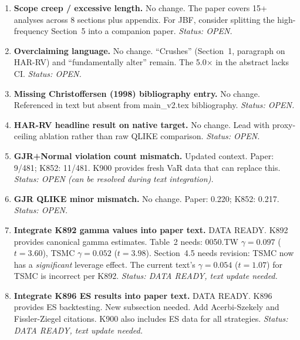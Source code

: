 \documentclass[12pt,a4paper]{article}
\begin{document}
\begin{enumerate}[label=\textcolor{warncolor}{M\arabic*}]

\item \textbf{Scope creep / excessive length.} \textcolor{warncolor}{No change.} The paper covers 15+ analyses across 8 sections plus appendix. For JBF, consider splitting the high-frequency Section~5 into a companion paper. \textit{Status: OPEN.}

\item \textbf{Overclaiming language.} \textcolor{warncolor}{No change.} ``Crushes'' (Section~1, paragraph on HAR-RV) and ``fundamentally alter'' remain. The 5.0$\times$ in the abstract lacks CI. \textit{Status: OPEN.}

\item \textbf{Missing Christoffersen (1998) bibliography entry.} \textcolor{warncolor}{No change.} Referenced in text but absent from main\_v2.tex bibliography. \textit{Status: OPEN.}

\item \textbf{HAR-RV headline result on native target.} \textcolor{warncolor}{No change.} Lead with proxy-ceiling ablation rather than raw QLIKE comparison. \textit{Status: OPEN.}

\item \textbf{GJR+Normal violation count mismatch.} \textcolor{warncolor}{Updated context.} Paper: 9/481; K852: 11/481. K900 provides fresh VaR data that can replace this. \textit{Status: OPEN (can be resolved during text integration).}

\item \textbf{GJR QLIKE minor mismatch.} \textcolor{warncolor}{No change.} Paper: 0.220; K852: 0.217. \textit{Status: OPEN.}

\item \textbf{Integrate K892 gamma values into paper text.} \textcolor{fixedblue}{DATA READY.} K892 provides canonical gamma estimates. Table~2 needs: 0050.TW $\gamma = 0.097$ ($t = 3.60$), TSMC $\gamma = 0.052$ ($t = 3.98$). Section~4.5 needs revision: TSMC now has a \textit{significant} leverage effect. The current text's $\gamma = 0.054$ ($t = 1.07$) for TSMC is incorrect per K892. \textit{Status: DATA READY, text update needed.}

\item \textbf{Integrate K896 ES results into paper text.} \textcolor{fixedblue}{DATA READY.} K896 provides ES backtesting. New subsection needed. Add Acerbi-Szekely and Fissler-Ziegel citations. K900 also includes ES data for all strategies. \textit{Status: DATA READY, text update needed.}

\end{enumerate}
\end{document}
